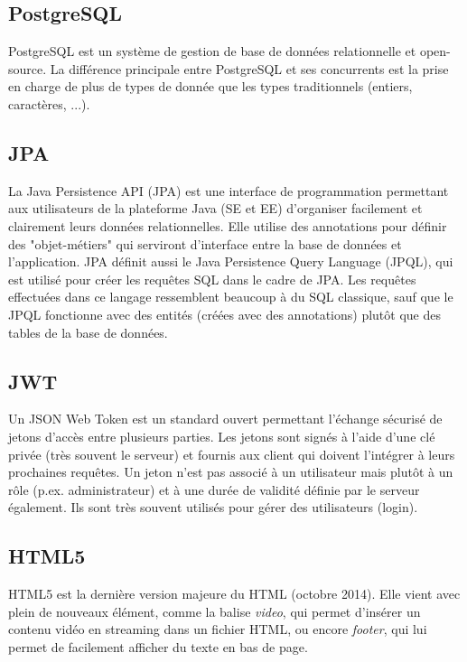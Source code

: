 \documentclass[french]{article}
\begin{document}
\subsection{PostgreSQL}
PostgreSQL est un système de gestion de base de données relationnelle et open-source. La différence principale entre PostgreSQL et ses concurrents est la prise en charge de plus de types de donnée que les types traditionnels (entiers, caractères, ...).

\subsection{JPA}
La Java Persistence API (JPA) est une interface de programmation permettant aux utilisateurs de la plateforme Java (SE et EE) d'organiser facilement et clairement leurs données relationnelles. Elle utilise des annotations pour définir des "objet-métiers" qui serviront d'interface entre la base de données et l'application. \newline
JPA définit aussi le Java Persistence Query Language (JPQL), qui est utilisé pour créer les requêtes SQL dans le cadre de JPA. Les requêtes effectuées dans ce langage ressemblent beaucoup à du SQL classique, sauf que le JPQL fonctionne avec des entités (créées avec des annotations) plutôt que des tables de la base de données.

\subsection{JWT}
Un JSON Web Token est un standard ouvert permettant l'échange sécurisé de jetons d'accès entre plusieurs parties. Les jetons sont signés à l'aide d'une clé privée (très souvent le serveur) et fournis aux client qui doivent l'intégrer à leurs prochaines requêtes. Un jeton n'est pas associé à un utilisateur mais plutôt à un rôle (p.ex. administrateur) et à une durée de validité définie par le serveur également. Ils sont très souvent utilisés pour gérer des utilisateurs (login).

\subsection{HTML5}
HTML5 est la dernière version majeure du HTML (octobre 2014). Elle vient avec plein de nouveaux élément, comme la balise \textit{video}, qui permet d'insérer un contenu vidéo en streaming dans un fichier HTML, ou encore \textit{footer}, qui lui permet de facilement afficher du texte en bas de page.
\end{document}
